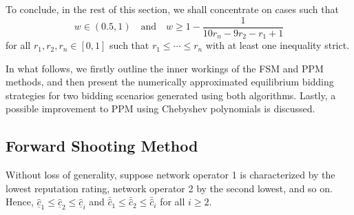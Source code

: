 To conclude, in the rest of this section, we shall concentrate on cases such that
\begin{equation*}
  w \in (0.5, 1) \quad\textrm{and}\quad w \geq 1 - \frac{1}{10r_n - 9r_2 - r_1 + 1}
\end{equation*}
for all $r_1,r_2,r_n\in [0,1]$ such that $r_1\leq\cdots\leq r_n$ with at least one inequality strict.

In what follows, we firstly outline the inner workings of the FSM and PPM methods, and then present the numerically approximated equilibrium bidding strategies for two bidding scenarios generated using both algorithms. Lastly, a possible improvement to PPM using Chebyshev polynomials is discussed.

\subsection{Forward Shooting Method} %
\label{sub:forward_shooting_method_indirect}
Without loss of generality, suppose network operator 1 is characterized by the lowest reputation rating, network operator 2 by the second lowest, and so on. Hence, $\underline{\hat{c}}_1\leq \underline{\hat{c}}_2\leq \underline{\hat{c}}_i$ and $\bar{\hat{c}}_1\leq \bar{\hat{c}}_2\leq \bar{\hat{c}}_i$ for all $i\geq 2$.

